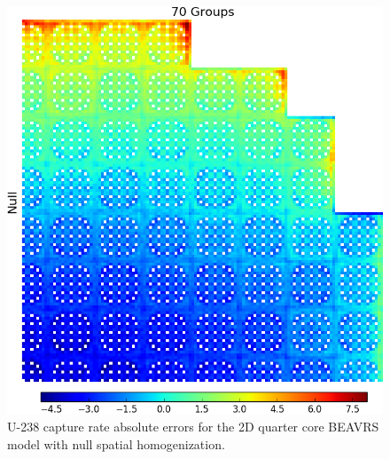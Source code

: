 \begin{figure}[h!]
\centering
\includegraphics[width=\linewidth]{figures/patterns/lns/full-core/capt-err-null}
\vspace{2mm}
\caption[U-238 capture rate errors for \ac{BEAVRS} with null homogenization]{U-238 capture rate absolute errors for the 2D quarter core \ac{BEAVRS} model with null spatial homogenization.}
\label{fig:chap9-full-core-capt-err-null}
\end{figure}

\clearpage

